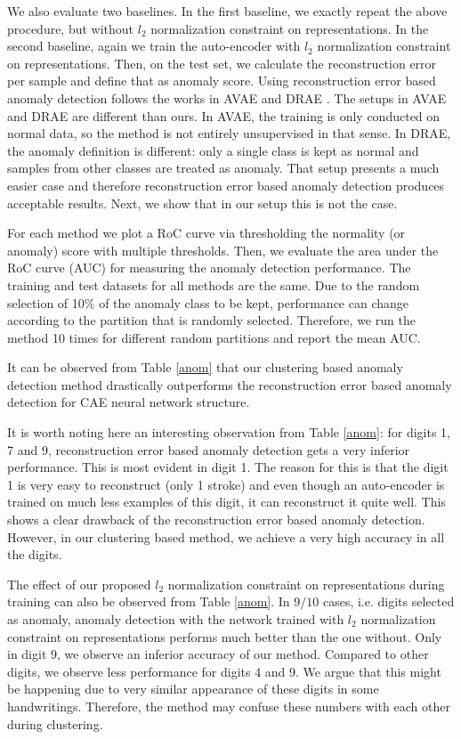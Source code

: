 \documentclass[conference]{IEEEtran}
\begin{document}
We also evaluate two baselines. 
In the first baseline, we exactly repeat the above procedure, but without $l_2$ normalization constraint on representations. 
In the second baseline, again we train the auto-encoder with $l_2$ normalization constraint on representations.
Then, on the test set, we calculate the reconstruction error per sample and define that as anomaly score.
Using reconstruction error based anomaly detection follows the works in AVAE \cite{AVAE} and DRAE \cite{DRAE}.
The setups in AVAE and DRAE are different than ours. 
In AVAE, the training is only conducted on normal data, so the method is not entirely unsupervised in that sense.
In DRAE, the anomaly definition is different: only a single class is kept as normal and samples from other classes are treated as anomaly.
That setup presents a much easier case and therefore reconstruction error based anomaly detection produces acceptable results.
Next, we show that in our setup this is not the case.

For each method we plot a RoC curve via thresholding the normality (or anomaly) score with multiple thresholds. 
Then, we evaluate the area under the RoC curve (AUC) for measuring the anomaly detection performance. 
The training and test datasets for all methods are the same. 
Due to the random selection of 10$\%$ of the anomaly class to be kept, performance can change according to the partition that is randomly selected. Therefore, we run the method 10 times for different random partitions and report the mean AUC.

It can be observed from Table \ref{anom} that our clustering based anomaly detection method drastically outperforms the reconstruction error based anomaly detection for CAE neural network structure. 

It is worth noting here an interesting observation from Table \ref{anom}: for digits 1, 7 and 9, reconstruction error based anomaly detection gets a very inferior performance. 
This is most evident in digit 1. 
The reason for this is that the digit 1 is very easy to reconstruct (only 1 stroke) and even though an auto-encoder is trained on much less examples of this digit, it can reconstruct it quite well. 
This shows a clear drawback of the reconstruction error based anomaly detection. 
However, in our clustering based method, we achieve a very high accuracy in all the digits.

The effect of our proposed $l_2$ normalization constraint on representations during training can also be observed from Table \ref{anom}.
In $9/10$ cases, i.e. digits selected as anomaly, anomaly detection with the network trained with $l_2$ normalization constraint on representations performs much better than the one without. 
Only in digit $9$, we observe an inferior accuracy of our method.
Compared to other digits, we observe less performance for digits 4 and 9. 
We argue that this might be happening due to very similar appearance of these digits in some handwritings.
Therefore, the method may confuse these numbers with each other during clustering.
\end{document}
